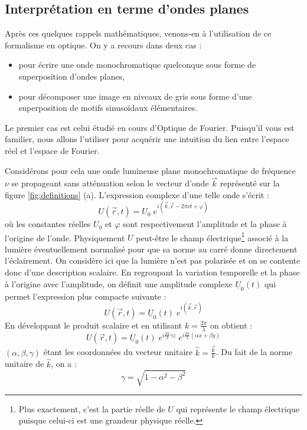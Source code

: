 \documentclass[a4paper,twoside,10pt]{book}
\begin{document}
\subsection{Interprétation en terme d'ondes planes}

Après ces quelques rappels mathématiques, venons-en à l'utilisation de ce formalisme en optique. On y a recours dans deux cas :
\begin{itemize}
\item pour écrire une onde monochromatique quelconque sous forme de superposition d'ondes planes,
\item pour décomposer une image en niveaux de gris sous forme d'une superposition de motifs sinusoïdaux élémentaires.
\end{itemize}
Le premier cas est celui étudié en cours d'Optique de Fourier. Puisqu'il vous est familier, nous allons l'utiliser pour acquérir une intuition du lien entre l'espace réel et l'espace de Fourier.

Considérons pour cela une onde lumineuse plane monochromatique de fréquence $\nu$ se propageant sans atténuation selon le vecteur d'onde $\vec{k}$ représenté sur la figure \ref{fig:definitions} (a). L'expression complexe d'une telle onde s'écrit :
\begin{equation}
U(\vec{r}, t) = U_0 \; e^{i(\vec{k}.\vec{r} - 2\pi \nu t + \varphi)}
\end{equation}
où les constantes réelles $U_0$ et $\varphi$ sont respectivement l'amplitude et la phase à l'origine de l'onde. Physiquement $U$ peut-être le champ électrique\footnote{Plus exactement, c'est la partie réelle de $U$ qui représente le champ électrique puisque celui-ci est une grandeur physique réelle.} associé à la lumière éventuellement normalisé pour que sa norme au carré donne directement l'éclairement. On considère ici que la lumière n'est pas polarisée et on se contente donc d'une description scalaire. En regroupant la variation temporelle et la phase à l'origine avec l'amplitude, on définit une amplitude complexe $\underline{U}_0(t)$ qui permet l'expression plus compacte suivante :
\begin{equation}
U(\vec{r}, t) = \underline{U}_0(t) \; e^{i(\vec{k}.\vec{r})}
\end{equation}
En développant le produit scalaire et en utilisant $k = \frac{2\pi}{\lambda}$ on obtient :
\begin{equation}\label{eq:UOndePlane}
U(\vec{r}, t) = \underline{U}_0(t) \; e^{i\frac{2\pi}{\lambda}\gamma z} \; e^{i \frac{2\pi}{\lambda}(\alpha x + \beta y)}
\end{equation}
$(\alpha, \beta, \gamma)$ étant les coordonnées du vecteur unitaire $\hat{k} = \frac{\vec{k}}{k}$. Du fait de la norme unitaire de $\hat{k}$, on a :
\begin{equation}
\gamma = \sqrt{1 - \alpha^2 - \beta^2}
\end{equation}
\end{document}
